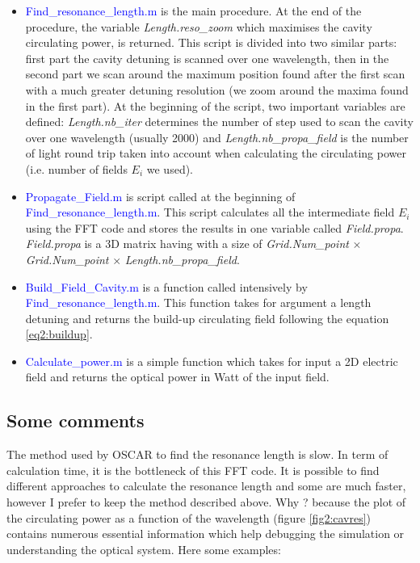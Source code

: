 \begin{itemize}
  \item \textcolor{blue}{Find\_resonance\_length.m} is the main procedure. At the end of the procedure, the variable \textsl{Length.reso\_zoom} which maximises the cavity circulating power, is returned. This script is divided into two similar parts: first part the cavity detuning is scanned over one wavelength, then in the second part we scan around the maximum position found after the first scan with a much greater detuning resolution (we zoom around the maxima found in the first part). At the beginning of the script, two important variables are defined: \emph{Length.nb\_iter} determines the number of step used to scan the cavity over one wavelength (usually 2000) and \emph{Length.nb\_propa\_field} is the number of light round trip taken into account when calculating the circulating power (i.e. number of fields $E_i$ we used).
  \item \textcolor{blue}{Propagate\_Field.m} is script called at the beginning of \textcolor{blue}{Find\_resonance\_length.m}. This script calculates all the intermediate field $E_i$ using the FFT code and stores the results in one variable called \emph{Field.propa}. \emph{Field.propa} is a 3D matrix having with a size of \emph{Grid.Num\_point} $\times$ \emph{Grid.Num\_point} $\times$ \emph{Length.nb\_propa\_field}.
  \item \textcolor{blue}{Build\_Field\_Cavity.m} is a function called intensively by \textcolor{blue}{Find\_resonance\_length.m}. This function takes for argument a length detuning and returns the build-up circulating  field following the equation \ref{eq2:buildup}.
  \item \textcolor{blue}{Calculate\_power.m} is a simple function which takes for input a 2D electric field and returns the optical power in Watt of the input field.
\end{itemize}

\subsection{Some comments}

The method used by OSCAR to find the resonance length is slow. In term of calculation time, it is the bottleneck of this FFT code. It is possible to find different approaches to calculate the resonance length and some are much faster, however I prefer to keep the method described above. Why ? because the plot of the circulating power as a function of the wavelength (figure \ref{fig2:cavres}) contains numerous essential information which help debugging the simulation or understanding the optical system. Here some examples:

